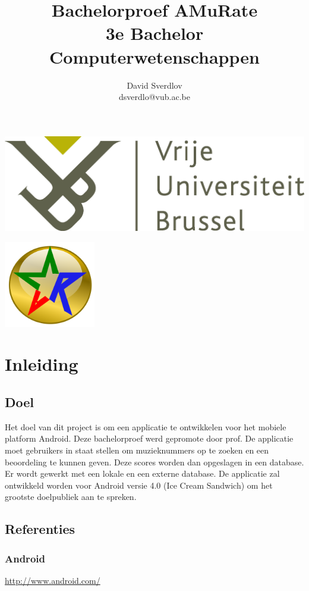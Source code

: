 \documentclass[11pt,a4paper]{article}
\author{David Sverdlov \\ dsverdlo@vub.ac.be}
\title{Bachelorproef AMuRate\\ 3e Bachelor Computerwetenschappen}
\begin{document}
\begin{flushleft}
\noindent \includegraphics[width=0.6\linewidth]{vub_logo.jpg} 
\end{flushleft}
{\let\newpage\relax\maketitle} %

\begin{center}
\includegraphics[width=4cm]{amr_gold_thick.png} 
\end{center}



\newpage
\tableofcontents

\newpage
\section{Inleiding}
	\subsection{Doel}
Het doel van dit project is om een applicatie te ontwikkelen voor het mobiele platform Android. Deze bachelorproef werd gepromote door prof. De applicatie moet gebruikers in staat stellen om muzieknummers op te zoeken en een beoordeling te kunnen geven. Deze scores worden dan opgeslagen in een database. Er wordt gewerkt met een lokale en een externe database. De applicatie zal ontwikkeld worden voor Android versie 4.0 (Ice Cream Sandwich) om het grootste doelpubliek aan te spreken.

	\subsection{Referenties}
		\subsubsection{Android}
			\url{http://www.android.com/}
\end{document}
